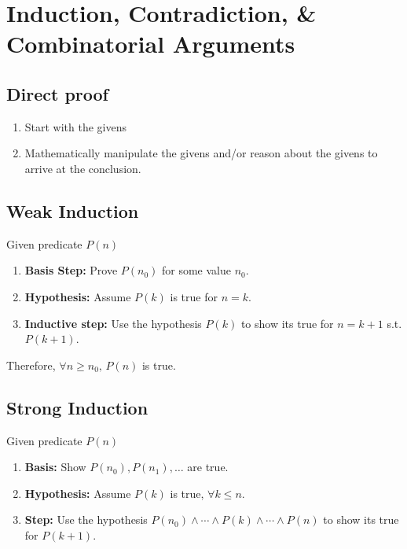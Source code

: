 \documentclass{article}
\begin{document}
\section{Induction, Contradiction, \& Combinatorial Arguments}
\subsection{Direct proof}
\begin{process}
    \begin{enumerate}
        \item Start with the givens
        \item Mathematically manipulate the givens and/or reason about the givens to arrive at the conclusion.
    \end{enumerate}
\end{process}

\subsection{Weak Induction}
\begin{process}
    Given predicate $P(n)$
    \begin{enumerate}
        \item \textbf{Basis Step:} Prove $P(n_0)$ for some value $n_0$. 
        \item \textbf{Hypothesis:} Assume $P(k)$ is true for $n=k$.
        \item \textbf{Inductive step:} Use the hypothesis $P(k)$ to show its true for $n=k+1$ s.t. $P(k+1)$.
    \end{enumerate}
    Therefore, $\forall n \geq n_0 \text{, } P(n)$ is true.
\end{process}

\subsection{Strong Induction}
\begin{process} 
    Given predicate $P(n)$
    \begin{enumerate}
        \item \textbf{Basis:} Show \( P(n_0), P(n_1), \ldots \) are true.
        \item \textbf{Hypothesis:} Assume \( P(k) \) is true, \( \forall k \leq n \).
        \item \textbf{Step:} Use the hypothesis \( P(n_0) \land \cdots \land P(k) \land \cdots \land P(n)\) to show its true for \( P(k+1) \).
    \end{enumerate}    
\end{process}
\end{document}
